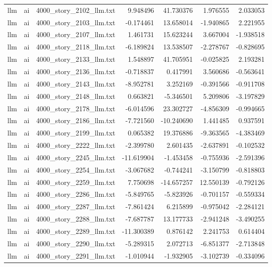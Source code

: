 \begin{longtable}{lllrrrr}
llm & ai & 4000\_story\_2102\_llm.txt & 9.948496 & 41.730376 & 1.976555 & 2.033053 \\
llm & ai & 4000\_story\_2103\_llm.txt & -0.174461 & 13.658014 & -1.940865 & 2.221955 \\
llm & ai & 4000\_story\_2107\_llm.txt & 1.461731 & 15.623244 & 3.667004 & -1.938518 \\
llm & ai & 4000\_story\_2118\_llm.txt & -6.189824 & 13.538507 & -2.278767 & -0.828695 \\
llm & ai & 4000\_story\_2133\_llm.txt & 1.548897 & 41.705951 & -0.025825 & 2.193281 \\
llm & ai & 4000\_story\_2136\_llm.txt & -0.718837 & 0.417991 & 3.560686 & -0.563641 \\
llm & ai & 4000\_story\_2143\_llm.txt & -8.952781 & 3.252169 & -0.391566 & -0.911708 \\
llm & ai & 4000\_story\_2148\_llm.txt & 0.663821 & -5.346501 & 5.209806 & -3.197829 \\
llm & ai & 4000\_story\_2178\_llm.txt & -6.014596 & 23.302727 & -4.856309 & -0.994665 \\
llm & ai & 4000\_story\_2186\_llm.txt & -7.721560 & -10.240690 & 1.441485 & 0.937591 \\
llm & ai & 4000\_story\_2199\_llm.txt & 0.065382 & 19.376886 & -9.363565 & -4.383469 \\
llm & ai & 4000\_story\_2222\_llm.txt & -2.399780 & 2.601435 & -2.637891 & -0.102532 \\
llm & ai & 4000\_story\_2245\_llm.txt & -11.619904 & -1.453458 & -0.755936 & -2.591396 \\
llm & ai & 4000\_story\_2254\_llm.txt & -3.067682 & -0.744241 & -3.150799 & -0.818803 \\
llm & ai & 4000\_story\_2259\_llm.txt & 7.750698 & -14.657257 & 12.550139 & -0.792126 \\
llm & ai & 4000\_story\_2286\_llm.txt & -5.849765 & -5.823926 & -0.701157 & -0.559334 \\
llm & ai & 4000\_story\_2287\_llm.txt & -7.861424 & 6.215899 & -0.975042 & -2.284121 \\
llm & ai & 4000\_story\_2288\_llm.txt & -7.687787 & 13.177733 & -2.941248 & -3.490255 \\
llm & ai & 4000\_story\_2289\_llm.txt & -11.300389 & 0.876142 & 2.241753 & 0.614404 \\
llm & ai & 4000\_story\_2290\_llm.txt & -5.289315 & 2.072713 & -6.851377 & -2.713848 \\
llm & ai & 4000\_story\_2291\_llm.txt & -1.010944 & -1.932905 & -3.102739 & -0.334096 \\

\end{longtable}

